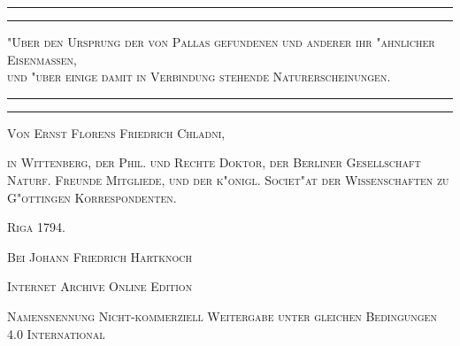 \documentclass[a4paper, 11pt, oneside, polutonikogreek, german]{article}
\begin{document}
\begin{titlepage} %
	\centering %

	
	\rule{\textwidth}{1.6pt}\vspace*{-\baselineskip}\vspace*{2pt} %
	\rule{\textwidth}{0.4pt} %
	
	\vspace{1\baselineskip} %
	
	{\scshape\Huge "Uber den Ursprung der von Pallas gefundenen und anderer ihr "ahnlicher Eisenmassen,\\ und "uber einige damit in Verbindung stehende Naturerscheinungen.}
	
	\vspace{1\baselineskip} %

	\rule{\textwidth}{0.4pt}\vspace*{-\baselineskip}\vspace{3.2pt} %
	\rule{\textwidth}{1.6pt} %
	
	\vspace{1\baselineskip} %
	
	
	{\scshape \Large Von Ernst Florens Friedrich Chladni,} %
	
	\vspace*{1\baselineskip} %
	
        {\scshape in Wittenberg, der Phil. und Rechte Doktor, der Berliner Gesellschaft Naturf. Freunde Mitgliede, und der k"onigl. Societ"at der Wissenschaften zu G"ottingen Korrespondenten.} %
    
        \vspace*{\fill}

	\vspace{1\baselineskip}

	{\small\scshape Riga 1794.}
	
	{\small\scshape{Bei Johann Friedrich Hartknoch}}
	
	\vspace{0.5\baselineskip} %

        \scshape Internet Archive Online Edition  %
	
	{\scshape\small Namensnennung Nicht-kommerziell Weitergabe unter gleichen Bedingungen 4.0 International} %
\end{titlepage}
\setlength{\parskip}{1mm plus1mm minus1mm}
\clearpage
\LARGE
\pagestyle{fancy}
\fancyhf{}
\cfoot{\swabfamily{\thepage}}
\tableofcontents
\clearpage
\end{document}
